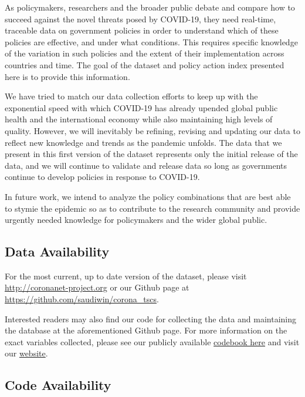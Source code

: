 \documentclass[
]{article}
\begin{document}
As policymakers, researchers and the broader public debate and compare how to succeed against the novel threats posed by COVID-19, they need real-time, traceable data on government policies in order to understand which of these policies are effective, and under what conditions. This requires specific knowledge of the variation in such policies and the extent of their implementation across countries and time. The goal of the dataset and policy action index presented here is to provide this information.

We have tried to match our data collection efforts to keep up with the exponential speed with which COVID-19 has already upended global public health and the international economy while also maintaining high levels of quality. However, we will inevitably be refining, revising and updating our data to reflect new knowledge and trends as the pandemic unfolds. The data that we present in this first version of the dataset represents only the initial release of the data, and we will continue to validate and release data so long as governments continue to develop policies in response to COVID-19.

In future work, we intend to analyze the policy combinations that are best able to stymie the epidemic so as to contribute to the research community and provide urgently needed knowledge for policymakers and the wider global public.

\newpage

\hypertarget{data-availability}{%
\subsection*{Data Availability}\label{data-availability}}

For the most current, up to date version of the dataset, please visit \url{http://coronanet-project.org} or our Github page at \url{https://github.com/saudiwin/corona_tscs}.

Interested readers may also find our code for collecting the data and maintaining the database at the aforementioned Github page. For more information on the exact variables collected, please see our publicly available \href{https://docs.google.com/document/d/1zvNMpwj0onFvUZ_gLl4RRjqS-clbHv3TIX6EOHofsME/edit?usp=sharing}{codebook here} and visit our \href{https://coronanet-project.org/}{website}.

\hypertarget{code-availability}{%
\subsection*{Code Availability}\label{code-availability}}
\end{document}
